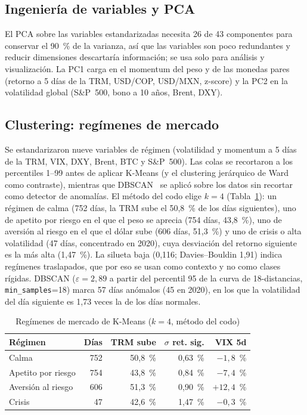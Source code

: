 \documentclass[conference]{IEEEtran}
\begin{document}
\subsection{Ingeniería de variables y PCA}
El PCA sobre las variables estandarizadas necesita 26 de 43 componentes para conservar el 90~\% de la varianza, así que las variables son poco redundantes y reducir dimensiones descartaría información; se usa solo para análisis y visualización. La PC1 carga en el momentum del peso y de las monedas pares (retorno a 5 días de la TRM, USD/COP, USD/MXN, z-score) y la PC2 en la volatilidad global (S\&P~500, bono a 10 años, Brent, DXY).

\subsection{Clustering: regímenes de mercado}
Se estandarizaron nueve variables de régimen (volatilidad y momentum a 5 días de la TRM, VIX, DXY, Brent, BTC y S\&P~500). Las colas se recortaron a los percentiles 1--99 antes de aplicar K-Means (y el clustering jerárquico de Ward como contraste), mientras que DBSCAN~\cite{ester1996} se aplicó sobre los datos sin recortar como detector de anomalías. El método del codo elige $k=4$ (Tabla~\ref{tab:regimes}): un régimen de calma (752 días, la TRM sube el 50,8~\% de los días siguientes), uno de apetito por riesgo en el que el peso se aprecia (754 días, 43,8~\%), uno de aversión al riesgo en el que el dólar sube (606 días, 51,3~\%) y uno de crisis o alta volatilidad (47 días, concentrado en 2020), cuya desviación del retorno siguiente es la más alta (1,47~\%). La silueta baja (0,116; Davies--Bouldin 1,91) indica regímenes traslapados, que por eso se usan como contexto y no como clases rígidas. DBSCAN ($\varepsilon=2{,}89$ a partir del percentil 95 de la curva de 18-distancias, \texttt{min\_samples}=18) marca 57 días anómalos (45 en 2020), en los que la volatilidad del día siguiente es 1,73 veces la de los días normales.

\begin{table}[t]
\caption{Regímenes de mercado de K-Means ($k=4$, método del codo)}
\label{tab:regimes}
\centering
\footnotesize
\begin{tabular}{@{}lrrrr@{}}
\toprule
Régimen & Días & TRM sube & $\sigma$ ret. sig. & VIX 5d \\
\midrule
Calma & 752 & 50,8~\% & 0,63~\% & $-1{,}8$~\% \\
Apetito por riesgo & 754 & 43,8~\% & 0,84~\% & $-7{,}4$~\% \\
Aversión al riesgo & 606 & 51,3~\% & 0,90~\% & $+12{,}4$~\% \\
Crisis & 47 & 42,6~\% & 1,47~\% & $-0{,}3$~\% \\
\bottomrule
\end{tabular}
\end{table}
\end{document}
